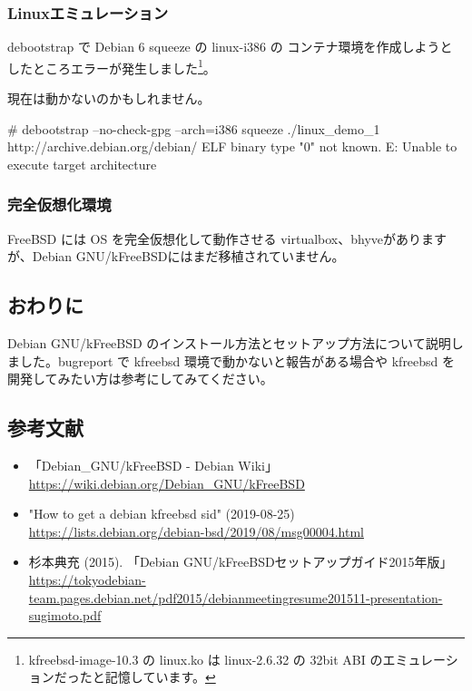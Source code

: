 \documentclass[mingoth,a4paper]{jsarticle}
\begin{document}
\subsubsection{Linuxエミュレーション}

debootstrap で Debian 6 squeeze の linux-i386 の コンテナ環境を作成しようとしたところエラーが発生しました\footnote{kfreebsd-image-10.3 の linux.ko は linux-2.6.32 の 32bit ABI のエミュレーションだったと記憶しています。}。

現在は動かないのかもしれません。

\begin{commandline}
# debootstrap --no-check-gpg --arch=i386 squeeze ./linux_demo_1 http://archive.debian.org/debian/
ELF binary type "0" not known.
E: Unable to execute target architecture
\end{commandline}


\subsubsection{完全仮想化環境}

FreeBSD には OS を完全仮想化して動作させる virtualbox、bhyveがありますが、Debian GNU/kFreeBSDにはまだ移植されていません。


\subsection{おわりに}

Debian GNU/kFreeBSD のインストール方法とセットアップ方法について説明しました。bugreport で kfreebsd 環境で動かないと報告がある場合や kfreebsd を開発してみたい方は参考にしてみてください。


\subsection{参考文献}

\begin{itemize}
  \item 「Debian\_GNU/kFreeBSD - Debian Wiki」 \url{https://wiki.debian.org/Debian\_GNU/kFreeBSD}
  \item "How to get a debian kfreebsd sid" (2019-08-25) \url{https://lists.debian.org/debian-bsd/2019/08/msg00004.html}
  \item 杉本典充 (2015). 「Debian GNU/kFreeBSDセットアップガイド2015年版」 \url{https://tokyodebian-team.pages.debian.net/pdf2015/debianmeetingresume201511-presentation-sugimoto.pdf}
\end{itemize}
\end{document}
